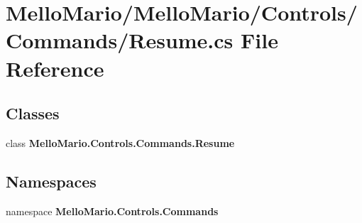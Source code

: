 \section{Mello\+Mario/\+Mello\+Mario/\+Controls/\+Commands/\+Resume.cs File Reference}
\label{Resume_8cs}
\subsection*{Classes}
\begin{DoxyCompactItemize}
\item 
class \textbf{ Mello\+Mario.\+Controls.\+Commands.\+Resume}
\end{DoxyCompactItemize}
\subsection*{Namespaces}
\begin{DoxyCompactItemize}
\item 
namespace \textbf{ Mello\+Mario.\+Controls.\+Commands}
\end{DoxyCompactItemize}
